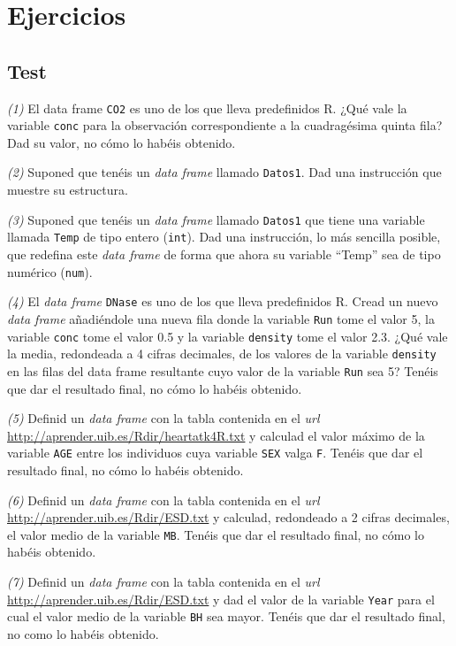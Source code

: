 \documentclass[
]{book}
\theoremstyle{definition}
\theoremstyle{definition}
\theoremstyle{definition}
\theoremstyle{remark}
\begin{document}
\hypertarget{ejercicios-4}{%
\section{Ejercicios}\label{ejercicios-4}}

\hypertarget{test-3}{%
\subsection*{Test}\label{test-3}}

\emph{(1)} El data frame \texttt{CO2} es uno de los que lleva predefinidos R. ¿Qué vale la variable \texttt{conc} para la observación correspondiente a la cuadragésima quinta fila? Dad su valor, no cómo lo habéis obtenido.

\emph{(2)} Suponed que tenéis un \emph{data frame} llamado \texttt{Datos1}. Dad una instrucción que muestre su estructura.

\emph{(3)} Suponed que tenéis un \emph{data frame} llamado \texttt{Datos1} que tiene una variable llamada \texttt{Temp} de tipo entero (\texttt{int}). Dad una instrucción, lo más sencilla posible, que redefina este \emph{data frame} de forma que ahora su variable ``Temp'' sea de tipo numérico (\texttt{num}).

\emph{(4)} El \emph{data frame} \texttt{DNase} es uno de los que lleva predefinidos R. Cread un nuevo \emph{data frame} añadiéndole una nueva fila donde la variable \texttt{Run} tome el valor 5, la variable \texttt{conc} tome el valor 0.5 y la variable \texttt{density} tome el valor 2.3. ¿Qué vale la media, redondeada a 4 cifras decimales, de los valores de la variable \texttt{density} en las filas del data frame resultante cuyo valor de la variable \texttt{Run} sea 5? Tenéis que dar el resultado final, no cómo lo habéis obtenido.

\emph{(5)} Definid un \emph{data frame} con la tabla contenida en el \emph{url} \url{http://aprender.uib.es/Rdir/heartatk4R.txt} y calculad el valor máximo de la variable \texttt{AGE} entre los individuos cuya variable \texttt{SEX} valga \texttt{F}. Tenéis que dar el resultado final, no cómo lo habéis obtenido.

\emph{(6)} Definid un \emph{data frame} con la tabla contenida en el \emph{url} \url{http://aprender.uib.es/Rdir/ESD.txt} y calculad, redondeado a 2 cifras decimales, el valor medio de la variable \texttt{MB}. Tenéis que dar el resultado final, no cómo lo habéis obtenido.

\emph{(7)} Definid un \emph{data frame} con la tabla contenida en el \emph{url} \url{http://aprender.uib.es/Rdir/ESD.txt} y dad el valor de la variable \texttt{Year} para el cual el valor medio de la variable \texttt{BH} sea mayor. Tenéis que dar el resultado final, no como lo habéis obtenido.
\end{document}
